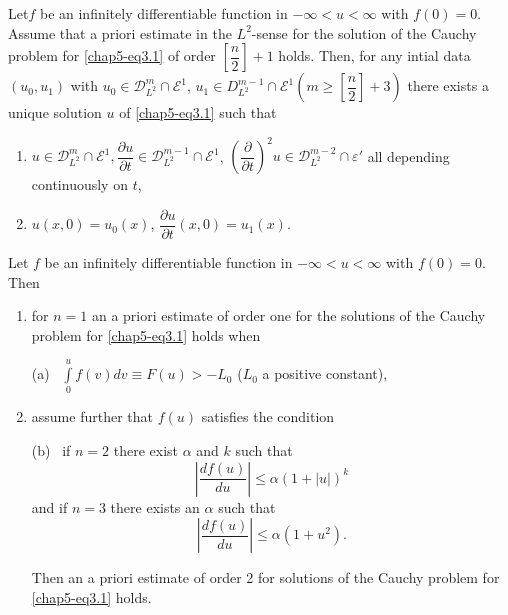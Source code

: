 \setcounter{theorem}{0}
\begin{theorem}\label{chap5-sec3-thm1} %
Let\pageoriginale $f$ be an infinitely differentiable function in 
$-\infty < u < \infty $ with $f(0) = 0$. Assume that a priori estimate in the
$L^2$-sense for the solution of the Cauchy problem for
\eqref{chap5-eq3.1} of order 
$\left[\dfrac{n}{2}\right]+ 1$ holds. Then, for any intial data $(u_0,
u_1)$ with 
$u_0 \in \mathscr{D}^m_{L^2} \cap  \mathscr{E}^1$, $u_1
\in D^{m -1}_{L^2} \cap \mathscr{E}^1 (m \geq
\left[\dfrac{n}{2} \right]+ 3)$ there exists a unique solution $u$ of
\eqref{chap5-eq3.1} such that  
\begin{enumerate}[\rm(1)]
\item $u \in \mathscr{D}^m_{L^2} \cap \mathscr{E}^1,
  \dfrac{\partial u}{\partial t}\in \mathscr{D}^{m-1}_{L^2}
  \cap \mathscr{E}^1$, $\left(\dfrac{\partial}{\partial t}\right)^2 u
  \in\mathscr{D}^{m -2}_{L^2} \cap \varepsilon'$ all depending
  continuously on $t$,  

\item $u(x, 0) = u_0(x)$, $\dfrac{\partial u}{\partial t}(x, 0) = u_1
  (x)$.  
\end{enumerate}
\end{theorem}

\setcounter{proposition}{0}
\begin{proposition}\label{chap5-sec3-prop1} %
Let $f$ be an infinitely differentiable function in $- \infty < u <
\infty$ with $f(0) = 0 $. Then  
\begin{enumerate}[\rm(i)]
\item for $n = 1$ an a priori estimate of order one for the solutions
  of the Cauchy problem for \eqref{chap5-eq3.1} holds when  

{\rm(a)}~ $\int\limits^u_0 f(v) dv \equiv F(u) > - L_0$ ($L_0$ a
  positive constant),  


\item assume further that $f(u)$ satisfies the condition  

{\rm(b)}~ if $n = 2 $ there exist $\alpha$ and $k$ such that 
$$
|\frac{df(u)}{du}| \leq \alpha (1+|u|)^k  
$$
and if $n = 3$ there exists an $\alpha$ such that 
$$
|\frac{df(u)}{du}|\leq \alpha (1+u^2).  
$$

Then an a priori estimate of order 2 for solutions of the Cauchy 
problem for \eqref{chap5-eq3.1} holds.  
\end{enumerate}
\end{proposition}

